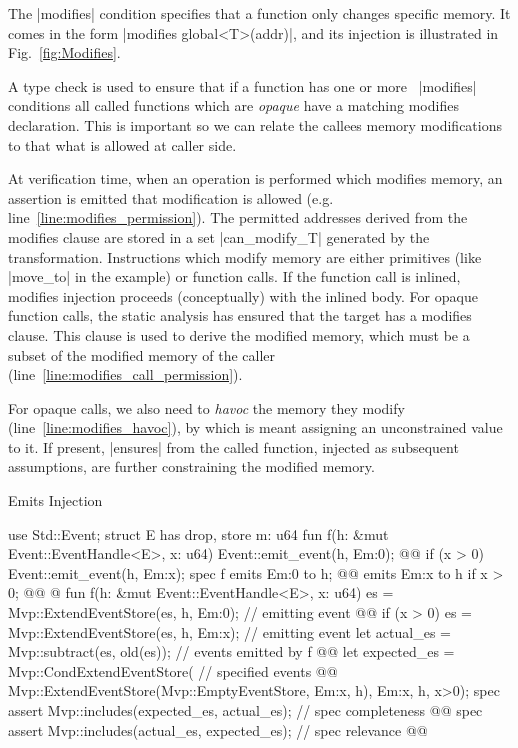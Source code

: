 The |modifies| condition specifies that a function only changes specific memory.
It comes in the form |modifies global<T>(addr)|, and its injection is
illustrated in Fig.~\ref{fig:Modifies}.

A type check is used to ensure that if a function has one or more~%
|modifies| conditions all called functions which are \emph{opaque} have a
matching modifies declaration. This is important so we can relate the callees
memory modifications to that what is allowed at caller side.

At verification time, when an operation is performed which modifies memory, an
assertion is emitted that modification is allowed
(e.g. line~\ref{line:modifies_permission}). The permitted addresses derived from
the modifies clause are stored in a set |can_modify_T| generated by the
transformation. Instructions which modify memory are either primitives (like
|move_to| in the example) or function calls. If the function call is inlined,
modifies injection proceeds (conceptually) with the inlined body. For opaque
function calls, the static analysis has ensured that the target has a modifies
clause.  This clause is used to derive the modified memory, which must be a
subset of the modified memory of the caller
(line~\ref{line:modifies_call_permission}).

For opaque calls, we also need to \emph{havoc} the memory they modify
(line~\ref{line:modifies_havoc}), by which is meant assigning an unconstrained
value to it. If present, |ensures| from the called function, injected as
subsequent assumptions, are further constraining the modified memory.



\begin{Figure}
  \caption{Emits Injection}
  \label{fig:Emits}
  \centering
\begin{MoveBoxNumbered}
  use Std::Event;
  struct E has drop, store { m: u64 }
  fun f(h: &mut Event::EventHandle<E>, x: u64) {
    Event::emit_event(h, E{m:0}); @\label{line:emit_event}@
    if (x > 0) {
      Event::emit_event(h, E{m:x});
    }
  }
  spec f {
    emits E{m:0} to h; @\label{line:emits}@
    emits E{m:x} to h if x > 0; @\label{line:emits_if}@
  }
  @\transform@
  fun f(h: &mut Event::EventHandle<E>, x: u64) {
    es = Mvp::ExtendEventStore(es, h, E{m:0}); // emitting event @\label{line:extend_es}@
    if (x > 0) {
      es = Mvp::ExtendEventStore(es, h, E{m:x}); // emitting event
    }
    let actual_es = Mvp::subtract(es, old(es)); // events emitted by f @\label{line:actual_es}@
    let expected_es = Mvp::CondExtendEventStore( // specified events @\label{line:expected_es}@
      Mvp::ExtendEventStore(Mvp::EmptyEventStore, E{m:x}, h),
      E{m:x}, h, x>0);
    spec assert Mvp::includes(expected_es, actual_es); // spec completeness @\label{line:emits_completeness}@
    spec assert Mvp::includes(actual_es, expected_es); // spec relevance @\label{line:emits_relevance}@
  }
\end{MoveBoxNumbered}
\end{Figure}

